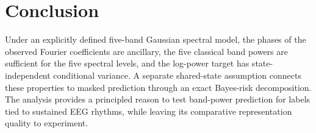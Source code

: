 \documentclass[11pt,a4paper]{article}
\begin{document}
\section{Conclusion}

Under an explicitly defined five-band Gaussian spectral model, the phases of
the observed Fourier coefficients are ancillary, the five classical band
powers are sufficient for the five spectral levels, and the log-power target
has state-independent conditional variance. A separate shared-state
assumption connects these properties to masked prediction through an exact
Bayes-risk decomposition. The analysis provides a principled reason to test
band-power prediction for labels tied to sustained EEG rhythms, while leaving
its comparative representation quality to experiment.
\end{document}
